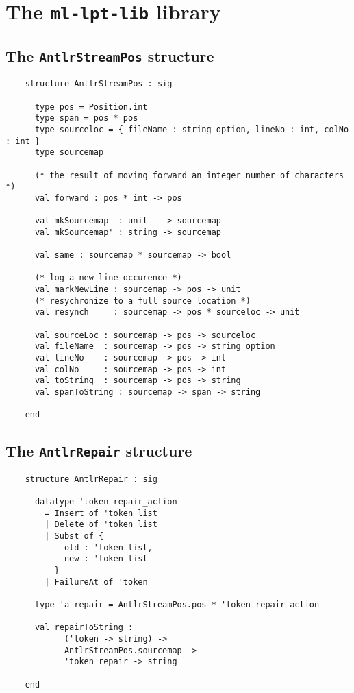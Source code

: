 %
\chapter{The {\tt ml-lpt-lib} library}
\label{ch:ml-lpt-lib}


\section{The {\tt AntlrStreamPos} structure}

\begin{verbatim}
    structure AntlrStreamPos : sig

      type pos = Position.int
      type span = pos * pos
      type sourceloc = { fileName : string option, lineNo : int, colNo : int }
      type sourcemap

      (* the result of moving forward an integer number of characters *)
      val forward : pos * int -> pos

      val mkSourcemap  : unit   -> sourcemap
      val mkSourcemap' : string -> sourcemap

      val same : sourcemap * sourcemap -> bool

      (* log a new line occurence *)
      val markNewLine : sourcemap -> pos -> unit
      (* resychronize to a full source location *)
      val resynch     : sourcemap -> pos * sourceloc -> unit

      val sourceLoc : sourcemap -> pos -> sourceloc
      val fileName  : sourcemap -> pos -> string option
      val lineNo    : sourcemap -> pos -> int
      val colNo     : sourcemap -> pos -> int
      val toString  : sourcemap -> pos -> string
      val spanToString : sourcemap -> span -> string

    end
\end{verbatim}


\section{The {\tt AntlrRepair} structure}

\begin{verbatim}
    structure AntlrRepair : sig

      datatype 'token repair_action
        = Insert of 'token list
        | Delete of 'token list
        | Subst of {
            old : 'token list,
            new : 'token list
          }
        | FailureAt of 'token
      
      type 'a repair = AntlrStreamPos.pos * 'token repair_action
      
      val repairToString : 
            ('token -> string) -> 
            AntlrStreamPos.sourcemap -> 
            'token repair -> string
        
    end
\end{verbatim}